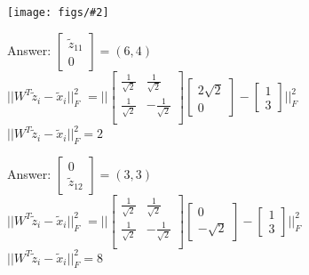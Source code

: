 \documentclass{article}
\def\ans#1{\par\gre{Answer: #1}}
\def\gre#1{{\color{gre}#1}}
\newcommand{\centerfig}[2]{\begin{center}\texttt{[image: figs/\#2]}\end{center}}
\begin{document}
\begin{enumerate}
%
%
%
\centerfig{0.8}{q3.1.4}
\ans{ $\begin{bmatrix} \tilde{z}_{11}\\0\end{bmatrix}=(6,4)$\\
$||W^T\tilde{z}_i - \tilde{x}_i||^2_F$
$=||
\begin{bmatrix}
    \frac{1}{\sqrt{2}} & \frac{1}{\sqrt{2}}\\
    \frac{1}{\sqrt{2}} & -\frac{1}{\sqrt{2}}\\
\end{bmatrix}
\begin{bmatrix} 2\sqrt{2} \\0\end{bmatrix} - 
\begin{bmatrix} 1\\3\end{bmatrix}
||^2_F$\\
$||W^T\tilde{z}_i - \tilde{x}_i||^2_F=2$\\
}
\ans{ $\begin{bmatrix} 0\\\tilde{z}_{12}\end{bmatrix}=(3,3)$\\
$||W^T\tilde{z}_i - \tilde{x}_i||^2_F$
$=||
\begin{bmatrix}
    \frac{1}{\sqrt{2}} & \frac{1}{\sqrt{2}}\\
    \frac{1}{\sqrt{2}} & -\frac{1}{\sqrt{2}}\\
\end{bmatrix}
\begin{bmatrix} 0\\-\sqrt{2}\end{bmatrix} - 
\begin{bmatrix} 1\\3\end{bmatrix}
||^2_F$\\
$||W^T\tilde{z}_i - \tilde{x}_i||^2_F=8$\\
}

\end{enumerate}
\end{document}
